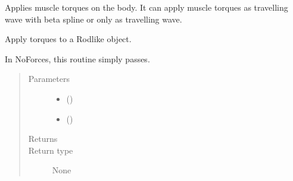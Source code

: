 \documentclass[letterpaper,10pt,english]{sphinxmanual}
\begin{document}
\begin{fulllineitems}
\label{\detokenize{documentation:elastica.external_forces.MuscleTorques}}
Applies muscle torques on the body. It can apply muscle torques
as travelling wave with beta spline or only as travelling wave.

\begin{fulllineitems}
\label{\detokenize{documentation:elastica.external_forces.MuscleTorques.apply_torques}}
Apply torques to a Rod\sphinxhyphen{}like object.

In NoForces, this routine simply passes.
\begin{quote}\begin{description}
\item[{Parameters}] \leavevmode\begin{itemize}
\item {} 
 () \textendash{} 

\item {} 
 (\sphinxstyleliteralemphasis{\sphinxupquote{, }}) \textendash{} 

\end{itemize}

\item[{Returns}] \leavevmode


\item[{Return type}] \leavevmode
None

\end{description}\end{quote}

\end{fulllineitems}


\end{fulllineitems}
\end{document}
